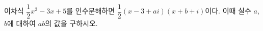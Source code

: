 이차식 $\dfrac{1}{2}x^2-3x+5$를 인수분해하면 $\dfrac{1}{2}(x-3+ai)(x+b+i)$이다. 이때 실수 $a$, $b$에 대하여 $ab$의 값을 구하시오.

